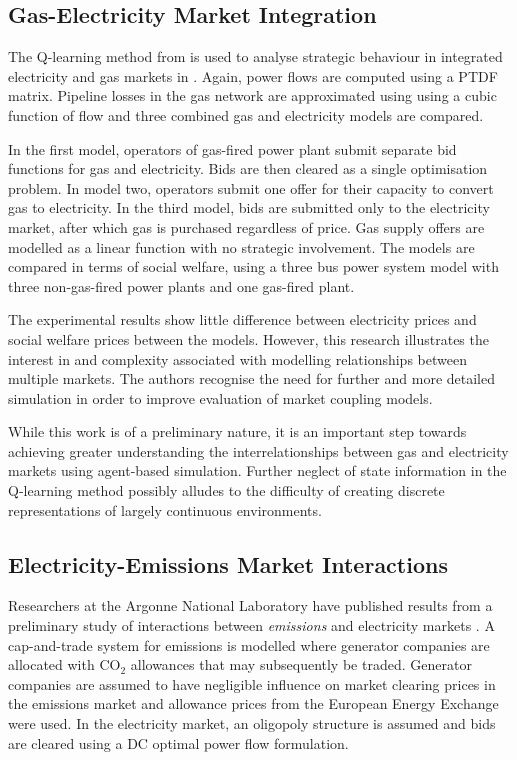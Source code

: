 \subsection{Gas-Electricity Market Integration}
The Q-learning method from  is used to
analyse strategic behaviour in integrated electricity and gas markets in
.  Again, power flows are computed using a PTDF matrix.
Pipeline losses in the gas network are approximated using using a cubic
function of flow and three combined gas and electricity models are
compared.

In the first model, operators of gas-fired power plant submit separate bid
functions for gas and electricity.  Bids are then cleared as a single
optimisation problem.  In model two, operators submit one offer for their
capacity to convert gas to electricity.  In the third model, bids are
submitted only to the electricity market, after which gas is purchased
regardless of price.  Gas supply offers are modelled as a linear function with
no strategic involvement.  The models are compared in terms of social welfare,
using a three bus power system model with three non-gas-fired power plants and
one gas-fired plant.

The experimental results show little difference between electricity prices and
social welfare prices between the models.  However, this research illustrates
the interest in and complexity associated with modelling relationships between
multiple markets.  The authors recognise the need for further and more detailed
simulation in order to improve evaluation of market coupling models.

While this work is of a preliminary nature, it is an important step towards
achieving greater understanding the interrelationships between gas and
electricity markets using agent-based simulation.  Further neglect of state
information in the Q-learning method possibly alludes to the difficulty of
creating discrete representations of largely continuous environments.

\subsection{Electricity-Emissions Market Interactions}
Researchers at the Argonne National Laboratory have published results from a
preliminary study of interactions between \textit{emissions} and electricity
markets \cite{wang:09}.  A cap-and-trade system for emissions is modelled where
generator companies are allocated with $\mbox{CO}_2$ allowances that may
subsequently be traded.  Generator companies are assumed to have negligible
influence on market clearing prices in the emissions market and allowance
prices from the European Energy Exchange were used.  In the electricity market,
an oligopoly structure is assumed and bids are cleared using a DC optimal power
flow formulation.

